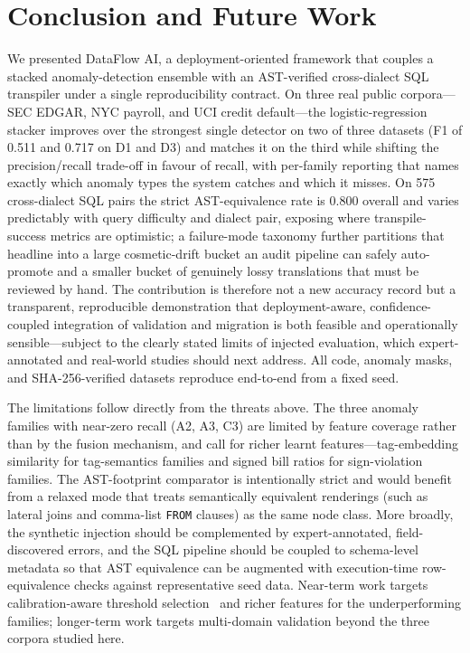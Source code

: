 \documentclass{ieeeaccess}
\begin{document}
\section{Conclusion and Future Work}
\label{sec:conclusion}

We presented DataFlow AI, a deployment-oriented framework that couples a stacked
anomaly-detection ensemble with an AST-verified cross-dialect SQL transpiler under
a single reproducibility contract. On three real public corpora---SEC EDGAR, NYC
payroll, and UCI credit default---the logistic-regression stacker improves over
the strongest single detector on two of three datasets (F1 of 0.511 and 0.717 on
D1 and D3) and matches it on the third while shifting the precision/recall
trade-off in favour of recall, with per-family reporting that names exactly which
anomaly types the system catches and which it misses. On 575 cross-dialect SQL
pairs the strict AST-equivalence rate is 0.800 overall and varies predictably with
query difficulty and dialect pair, exposing where transpile-success metrics are
optimistic; a failure-mode taxonomy further partitions that headline into a large
cosmetic-drift bucket an audit pipeline can safely auto-promote and a smaller
bucket of genuinely lossy translations that must be reviewed by hand. The
contribution is therefore not a new accuracy record but a transparent,
reproducible demonstration that deployment-aware, confidence-coupled integration
of validation and migration is both feasible and operationally sensible---subject
to the clearly stated limits of injected evaluation, which expert-annotated and
real-world studies should next address. All code, anomaly masks, and
SHA-256-verified datasets reproduce end-to-end from a fixed seed.

The limitations follow directly from the threats above. The three anomaly families
with near-zero recall (A2, A3, C3) are limited by feature coverage rather than by
the fusion mechanism, and call for richer learnt features---tag-embedding
similarity for tag-semantics families and signed bill ratios for sign-violation
families. The AST-footprint comparator is intentionally strict and would benefit
from a relaxed mode that treats semantically equivalent renderings (such as
lateral joins and comma-list \texttt{FROM} clauses) as the same node class. More
broadly, the synthetic injection should be complemented by expert-annotated,
field-discovered errors, and the SQL pipeline should be coupled to schema-level
metadata so that AST equivalence can be augmented with execution-time
row-equivalence checks against representative seed data. Near-term work targets
calibration-aware threshold selection~\cite{guo2017calibration,guo2021reliability}
and richer features for the underperforming families; longer-term work targets
multi-domain validation beyond the three corpora studied here.
\end{document}
